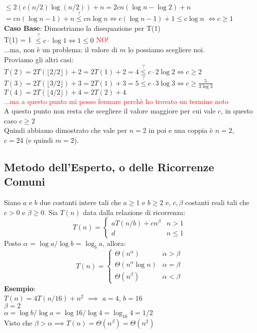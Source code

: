 \documentclass[../cheatSheetAlgoritmi.tex]{subfiles}
\begin{document}
$\leq 2(c(n/2) \log{(n/2)}) + n = 2cn(\log{n} - \log{2}) + n$\\
$= cn(\log{n} - 1) + n \stackrel{?}{\leq} cn\log{n} \iff c(\log{n}-1) + 1 \leq c \log{n}$ 
$\iff c \geq 1$\\
\textbf{Caso Base}: Dimostriamo la disequazione per T(1)\\
T(1) = 1 $\stackrel{?}{\leq} c \cdot \log{1} \iff 1 \leq 0$ \textcolor{red}{NO!}\\
...ma, non è un problema: il valore di $m$ lo possiamo scegliere noi.\\
Proviamo gli altri casi:\\
$T(2) = 2T(\lfloor 2/2 \rfloor) + 2 = 2T(1) + 2 = 4 \stackrel{?}{\leq} c \cdot 2 \log{2} \iff c \geq 2$\\
$T(3) = 2T(\lfloor 3/2 \rfloor) + 3 = 2T(1) + 3 = 5 \stackrel{?}{\leq} c \cdot 3 \log{3} \iff c \geq \frac{5}{3 \log{3}}$\\
$T(4) = 2T(\lfloor 4/2 \rfloor) + 4 = 2T(2) + 4$\\
\textcolor{red}{...ma a questo punto mi posso fermare perchè ho trovato un termine noto}\\
A questo punto non resta che scegliere il valore maggiore per cui vale $c$, in questo caso $c \geq 2$\\
Quindi abbiamo dimostrato che vale per $n = 2$ in poi e una coppia è $n = 2$, $c = 24$ (e quindi $m = 2$).\\
\subsection{Metodo dell'Esperto, o delle Ricorrenze Comuni}
Siano $a$ e $b$ due costanti intere tali che $a \geq 1$ e $b \geq 2$ e, $c, \beta$ costanti reali tali che $c > 0$ e $\beta \geq 0$. Sia $T(n)$ data dalla relazione di ricorrenza:
	\begin{equation*}
  		T(n)=\begin{cases}
    		aT(n/b) + cn^{\beta} & \text{$n > 1$}\\
    		d & \text{$n \leq 1$}
  		\end{cases}	
	\end{equation*}
Posto $\alpha$ = $\log{a}/\log{b}$ = $\log_{b}{a}$, allora:
	\begin{equation*}
  		T(n)=\begin{cases}
			\Theta(n^{\alpha}) & \text{$\alpha > \beta$}\\
    		\Theta(n^{\alpha} \log{n}) & \text{$\alpha = \beta$}\\
    		\Theta(n^{\beta}) & \text{$\alpha < \beta$}
  		\end{cases}
	\end{equation*}
\textbf{Esempio}:\\
$T(n) = 4T(n/16) + n^{2}$ $\implies$ $a = 4$, $b = 16$\\
$\beta = 2$\\
$\alpha = \log{b} / \log{a} = \log{16} / \log{4} = \log_{16}{4} = 1/2$\\
Visto che $\beta > \alpha \implies T(n) = \Theta(n^{\beta}) = \Theta(n^{2})$ 
\end{document}
